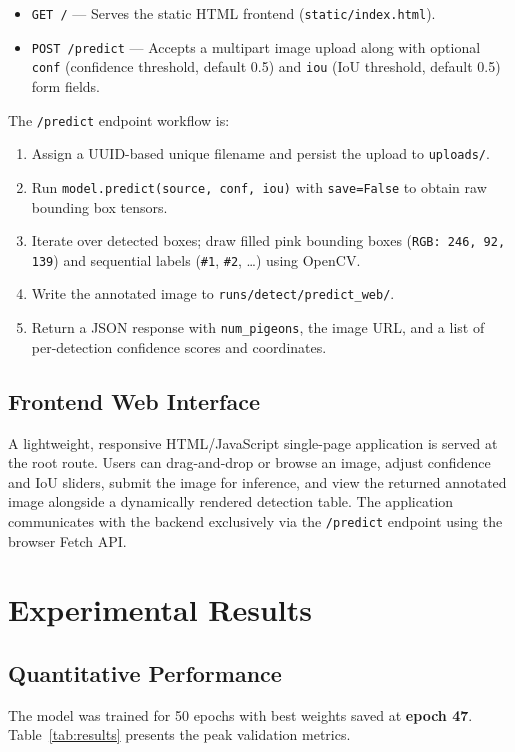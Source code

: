 \documentclass[journal]{IEEEtran}
\begin{document}
\begin{itemize}
  \item \texttt{GET /} --- Serves the static HTML frontend (\texttt{static/index.html}).
  \item \texttt{POST /predict} --- Accepts a multipart image upload along with optional \texttt{conf} (confidence threshold, default 0.5) and \texttt{iou} (IoU threshold, default 0.5) form fields.
\end{itemize}

The \texttt{/predict} endpoint workflow is:
\begin{enumerate}
  \item Assign a UUID-based unique filename and persist the upload to \texttt{uploads/}.
  \item Run \texttt{model.predict(source, conf, iou)} with \texttt{save=False} to obtain raw bounding box tensors.
  \item Iterate over detected boxes; draw filled pink bounding boxes (\texttt{RGB: 246, 92, 139}) and sequential labels (\texttt{\#1}, \texttt{\#2}, \ldots) using OpenCV.
  \item Write the annotated image to \texttt{runs/detect/predict\_web/}.
  \item Return a JSON response with \texttt{num\_pigeons}, the image URL, and a list of per-detection confidence scores and coordinates.
\end{enumerate}

\subsection{Frontend Web Interface}
A lightweight, responsive HTML/JavaScript single-page application is served at the root route. Users can drag-and-drop or browse an image, adjust confidence and IoU sliders, submit the image for inference, and view the returned annotated image alongside a dynamically rendered detection table. The application communicates with the backend exclusively via the \texttt{/predict} endpoint using the browser Fetch API.

\section{Experimental Results}
\label{sec:results}

\subsection{Quantitative Performance}
The model was trained for 50 epochs with best weights saved at \textbf{epoch 47}. Table~\ref{tab:results} presents the peak validation metrics.
\end{document}
